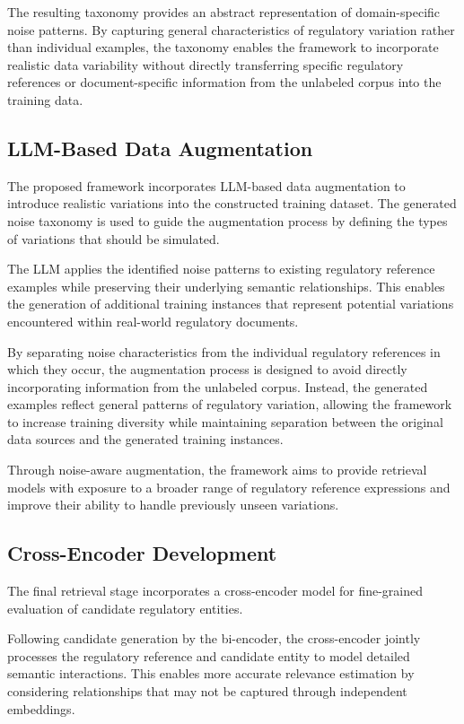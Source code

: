 The resulting taxonomy provides an abstract representation of domain-specific noise patterns. By capturing general characteristics of regulatory variation rather than individual examples, the taxonomy enables the framework to incorporate realistic data variability without directly transferring specific regulatory references or document-specific information from the unlabeled corpus into the training data.

\subsection{LLM-Based Data Augmentation}

The proposed framework incorporates LLM-based data augmentation to introduce realistic variations into the constructed training dataset. The generated noise taxonomy is used to guide the augmentation process by defining the types of variations that should be simulated.

The LLM applies the identified noise patterns to existing regulatory reference examples while preserving their underlying semantic relationships. This enables the generation of additional training instances that represent potential variations encountered within real-world regulatory documents.

By separating noise characteristics from the individual regulatory references in which they occur, the augmentation process is designed to avoid directly incorporating information from the unlabeled corpus. Instead, the generated examples reflect general patterns of regulatory variation, allowing the framework to increase training diversity while maintaining separation between the original data sources and the generated training instances.

Through noise-aware augmentation, the framework aims to provide retrieval models with exposure to a broader range of regulatory reference expressions and improve their ability to handle previously unseen variations.

\subsection{Cross-Encoder Development}

The final retrieval stage incorporates a cross-encoder model for fine-grained evaluation of candidate regulatory entities.

Following candidate generation by the bi-encoder, the cross-encoder jointly processes the regulatory reference and candidate entity to model detailed semantic interactions. This enables more accurate relevance estimation by considering relationships that may not be captured through independent embeddings.

